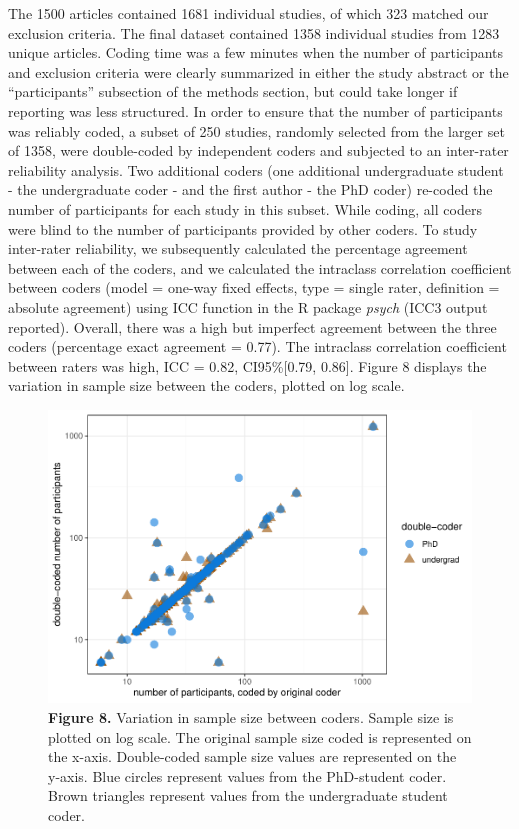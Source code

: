 \documentclass[
  man,floatsintext]{apa6}
\begin{document}
The 1500 articles contained 1681 individual studies, of which 323 matched our exclusion criteria. The final dataset contained 1358 individual studies from 1283 unique articles. Coding time was a few minutes when the number of participants and exclusion criteria were clearly summarized in either the study abstract or the ``participants'' subsection of the methods section, but could take longer if reporting was less structured. In order to ensure that the number of participants was reliably coded, a subset of 250 studies, randomly selected from the larger set of 1358, were double-coded by independent coders and subjected to an inter-rater reliability analysis. Two additional coders (one additional undergraduate student - the undergraduate coder - and the first author - the PhD coder) re-coded the number of participants for each study in this subset. While coding, all coders were blind to the number of participants provided by other coders. To study inter-rater reliability, we subsequently calculated the percentage agreement between each of the coders, and we calculated the intraclass correlation coefficient between coders (model = one-way fixed effects, type = single rater, definition = absolute agreement) using ICC function in the R package \emph{psych} (ICC3 output reported). Overall, there was a high but imperfect agreement between the three coders (percentage exact agreement = 0.77). The intraclass correlation coefficient between raters was high, ICC = 0.82, CI95\%{[}0.79, 0.86{]}. Figure 8 displays the variation in sample size between the coders, plotted on log scale.

\begin{figure}
\centering
\includegraphics{RVcn_feasibility_in_social_neuroscience_cortex_files/figure-latex/fig8-1.pdf}
\caption{\label{fig:fig8}\textbf{Figure 8.} Variation in sample size between coders. Sample size is plotted on log scale. The original sample size coded is represented on the x-axis. Double-coded sample size values are represented on the y-axis. Blue circles represent values from the PhD-student coder. Brown triangles represent values from the undergraduate student coder.}
\end{figure}
\end{document}
